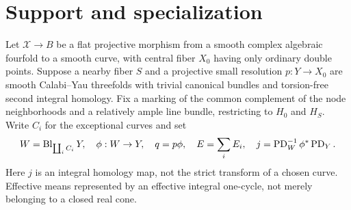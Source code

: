 \section{Support and specialization}\label{sec:specialization}

Let $\mathscr X\to B$ be a flat projective morphism from a smooth
complex algebraic fourfold to a smooth curve, with central fiber $X_0$
having only ordinary double points. Suppose a nearby fiber $S$ and a
projective small resolution $p:Y\to X_0$ are smooth Calabi--Yau
threefolds with trivial canonical bundles and torsion-free second
integral homology. Fix a marking of the common complement of the node
neighborhoods and a relatively ample line bundle, restricting to $H_0$
and $H_S$. Write $C_i$ for the exceptional curves and set
\[
 W=\operatorname{Bl}_{\coprod_i C_i}Y,\quad \phi:W\to Y,\quad q=p\phi,
 \quad E=\sum_i E_i,\quad
 j=\operatorname{PD}_W^{-1}\phi^*\operatorname{PD}_Y.
\]
Here $j$ is an integral homology map, not the strict transform of a
chosen curve. Effective means represented by an effective integral
one-cycle, not merely belonging to a closed real cone.

